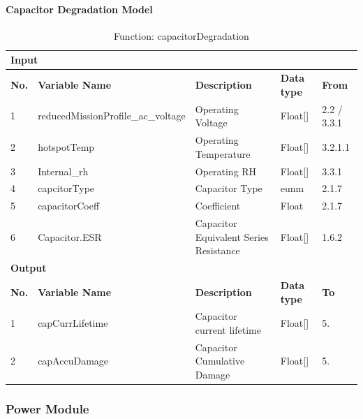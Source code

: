 \documentclass{article}
\begin{document}
\paragraph{Capacitor Degradation Model}
\begin{table}[h]
\centering
\caption{Function: capacitorDegradation}
\begin{tabular}{|l|l|l|l|l|}
\hline
\multicolumn{5}{|l|}{\textbf{Input}} \\ \hline
\textbf{No.} & \textbf{Variable Name} & \textbf{Description} & \textbf{Data type} & \textbf{From} \\ \hline
1 & reducedMissionProfile\_ac\_voltage & Operating Voltage & Float[] & 2.2 / 3.3.1 \\ \hline
2 & hotspotTemp & Operating Temperature & Float[] & 3.2.1.1 \\ \hline
3 & Internal\_rh & Operating RH & Float[] & 3.3.1 \\ \hline
4 & capcitorType & Capacitor Type & eunm & 2.1.7 \\ \hline
5 & capacitorCoeff & Coefficient & Float & 2.1.7 \\ \hline
6 & Capacitor.ESR & Capacitor Equivalent Series Resistance & Float[] & 1.6.2 \\ \hline
\multicolumn{5}{|l|}{\textbf{Output}} \\ \hline
\textbf{No.} & \textbf{Variable Name} & \textbf{Description} & \textbf{Data type} & \textbf{To} \\ \hline
1 & capCurrLifetime & Capacitor current lifetime & Float[] & 5. \\ \hline
2 & capAccuDamage & Capacitor Cumulative Damage & Float[] & 5. \\ \hline
\end{tabular}
\end{table}

\subsubsection{Power Module}
\end{document}
